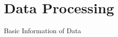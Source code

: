 \documentclass[
 size=12pt,
 paper=smartboard,  %
 mode=present, 		%
 display=slides, 	%
 style=tuliplab,  	%
 pauseslide,
 fleqn,leqno]{powerdot}
\begin{document}
\section{Data Processing}

\begin{slide}{Basic Information of Data}
\begin{center}
\setlength{\belowdisplayskip}{0pt}
\setlength{\abovedisplayskip}{0pt}
\begin{table}[h!]
\setlength{\belowdisplayskip}{0pt}
\setlength{\abovedisplayskip}{0pt}
\setlength{\abovecaptionskip}{0pt}
\setlength{\belowcaptionskip}{0pt}
\centering
\small
\caption{Data}
\end{table}
\end{center}
\end{slide}
\end{document}
